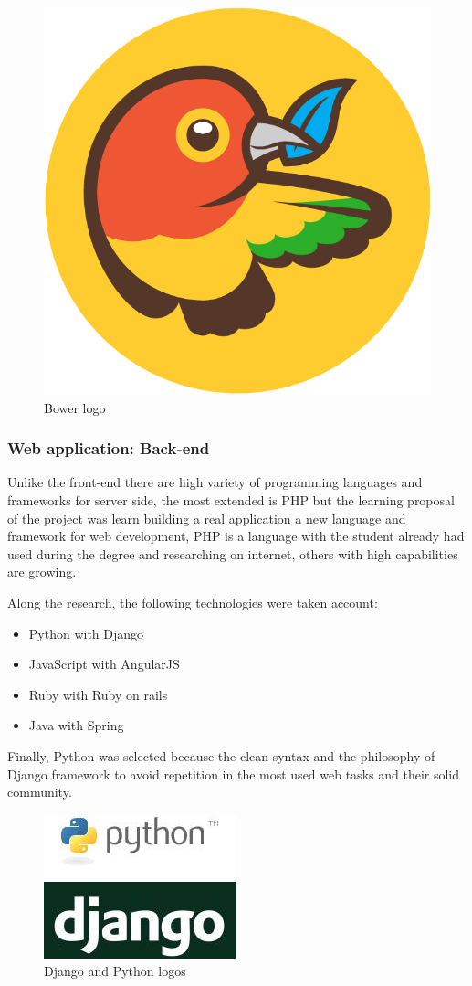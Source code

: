 \documentclass{DeustoFDP}
\begin{document}
\begin{figure}[h]
\centering
\includegraphics[width=0.3\linewidth]{fig/Bower}
\caption[Bower logo]{Bower logo}
\label{fig:Bower}
\end{figure}


\subsubsection{Web application: Back-end}
Unlike the front-end there are high variety of programming languages and frameworks for server side, the most extended is PHP but the learning proposal of the project was learn building a real application a new language and framework for web development, PHP is a language with the student already had used during the degree and researching on internet, others with high capabilities are growing.

Along the research, the following technologies were taken account:
\begin{itemize}
	\item Python with Django
	\item JavaScript with AngularJS
	\item Ruby with Ruby on rails
	\item Java with Spring
\end{itemize}

Finally, Python was selected because the clean syntax and the philosophy of Django framework to avoid repetition in the most used web tasks and their solid community.

\begin{figure}[h]
\centering
\includegraphics[width=0.5\linewidth]{fig/python-django}
\caption[Django and Python logos]{Django and Python logos}
\label{fig:python-django}
\end{figure}
\end{document}
